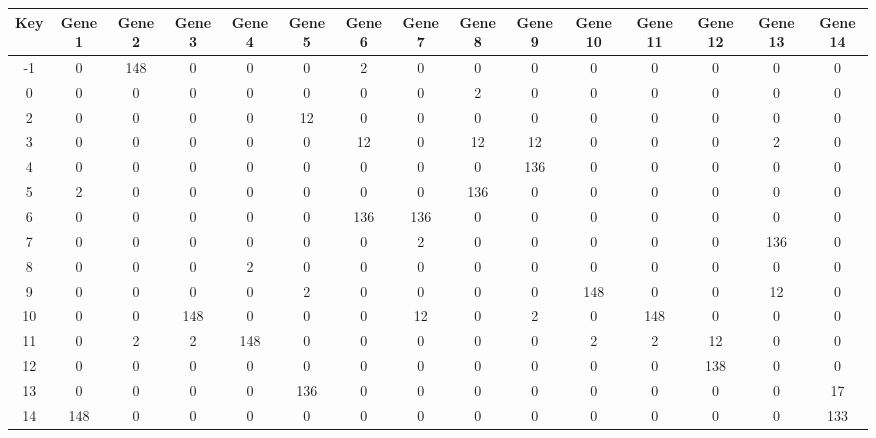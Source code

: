 \begin{tabular}{|c|c|c|c|c|c|c|c|c|c|c|c|c|c|c|}
\hline
Key & Gene 1 & Gene 2 & Gene 3 & Gene 4 & Gene 5 & Gene 6 & Gene 7 & Gene 8 & Gene 9 & Gene 10 & Gene 11 & Gene 12 & Gene 13 & Gene 14 \\
\hline
-1 & 0 & 148 & 0 & 0 & 0 & 2 & 0 & 0 & 0 & 0 & 0 & 0 & 0 & 0 \\
0 & 0 & 0 & 0 & 0 & 0 & 0 & 0 & 2 & 0 & 0 & 0 & 0 & 0 & 0 \\
2 & 0 & 0 & 0 & 0 & 12 & 0 & 0 & 0 & 0 & 0 & 0 & 0 & 0 & 0 \\
3 & 0 & 0 & 0 & 0 & 0 & 12 & 0 & 12 & 12 & 0 & 0 & 0 & 2 & 0 \\
4 & 0 & 0 & 0 & 0 & 0 & 0 & 0 & 0 & 136 & 0 & 0 & 0 & 0 & 0 \\
5 & 2 & 0 & 0 & 0 & 0 & 0 & 0 & 136 & 0 & 0 & 0 & 0 & 0 & 0 \\
6 & 0 & 0 & 0 & 0 & 0 & 136 & 136 & 0 & 0 & 0 & 0 & 0 & 0 & 0 \\
7 & 0 & 0 & 0 & 0 & 0 & 0 & 2 & 0 & 0 & 0 & 0 & 0 & 136 & 0 \\
8 & 0 & 0 & 0 & 2 & 0 & 0 & 0 & 0 & 0 & 0 & 0 & 0 & 0 & 0 \\
9 & 0 & 0 & 0 & 0 & 2 & 0 & 0 & 0 & 0 & 148 & 0 & 0 & 12 & 0 \\
10 & 0 & 0 & 148 & 0 & 0 & 0 & 12 & 0 & 2 & 0 & 148 & 0 & 0 & 0 \\
11 & 0 & 2 & 2 & 148 & 0 & 0 & 0 & 0 & 0 & 2 & 2 & 12 & 0 & 0 \\
12 & 0 & 0 & 0 & 0 & 0 & 0 & 0 & 0 & 0 & 0 & 0 & 138 & 0 & 0 \\
13 & 0 & 0 & 0 & 0 & 136 & 0 & 0 & 0 & 0 & 0 & 0 & 0 & 0 & 17 \\
14 & 148 & 0 & 0 & 0 & 0 & 0 & 0 & 0 & 0 & 0 & 0 & 0 & 0 & 133 \\
\hline
\end{tabular}